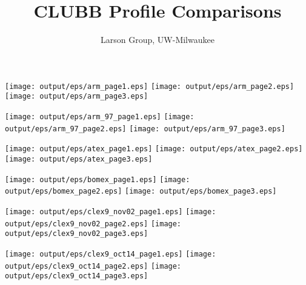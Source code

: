 \documentclass[11pt]{article}
\title{CLUBB Profile Comparisons}
\author{Larson Group, UW-Milwaukee}
\begin{document}
\begin{center}

\texttt{[image: output/eps/arm\_page1.eps]}
\texttt{[image: output/eps/arm\_page2.eps]}
\texttt{[image: output/eps/arm\_page3.eps]}
\end{center}
\newpage

\begin{center}

\texttt{[image: output/eps/arm\_97\_page1.eps]}
\texttt{[image: output/eps/arm\_97\_page2.eps]}
\texttt{[image: output/eps/arm\_97\_page3.eps]}
\end{center}
\newpage

\begin{center}

\texttt{[image: output/eps/atex\_page1.eps]}
\texttt{[image: output/eps/atex\_page2.eps]}
\texttt{[image: output/eps/atex\_page3.eps]}
\end{center}
\newpage


\begin{center}

\texttt{[image: output/eps/bomex\_page1.eps]}
\texttt{[image: output/eps/bomex\_page2.eps]}
\texttt{[image: output/eps/bomex\_page3.eps]}
\end{center}
\newpage

\begin{center}

\texttt{[image: output/eps/clex9\_nov02\_page1.eps]}
\texttt{[image: output/eps/clex9\_nov02\_page2.eps]}
\texttt{[image: output/eps/clex9\_nov02\_page3.eps]}
\end{center}
\newpage

\begin{center}

\texttt{[image: output/eps/clex9\_oct14\_page1.eps]}
\texttt{[image: output/eps/clex9\_oct14\_page2.eps]}
\texttt{[image: output/eps/clex9\_oct14\_page3.eps]}
\end{center}
\newpage
\end{document}
